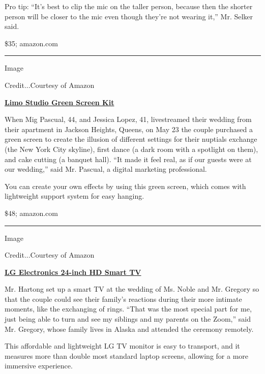 Pro tip: ``It's best to clip the mic on the taller person, because then
the shorter person will be closer to the mic even though they're not
wearing it,'' Mr. Selker said.

\$35; amazon.com

\begin{center}\rule{0.5\linewidth}{\linethickness}\end{center}

Image

Credit...Courtesy of Amazon

\textbf{\href{https://www.amazon.com/Photography-Backdrop-Support-Backdrops-AGG2983/dp/B08286P37D/ref=sr_1_6?dchild=1\&keywords=green+screen+kit\&qid=1593181526\&sr=8-6}{Limo
Studio Green Screen Kit}}

When Mig Pascual, 44, and Jessica Lopez, 41, livestreamed their wedding
from their apartment in Jackson Heights, Queens, on May 23 the couple
purchased a green screen to create the illusion of different settings
for their nuptials exchange (the New York City skyline), first dance (a
dark room with a spotlight on them), and cake cutting (a banquet hall).
``It made it feel real, as if our guests were at our wedding,'' said Mr.
Pascual, a digital marketing professional.

You can create your own effects by using this green screen, which comes
with lightweight support system for easy hanging.

\$48; amazon.com

\begin{center}\rule{0.5\linewidth}{\linethickness}\end{center}

Image

Credit...Courtesy of Amazon

\textbf{\href{https://www.amazon.com/LG-Electronics-24LM530S-PU-24-Inch-webOS/dp/B086XL48ZF/ref=sr_1_2?dchild=1\&keywords=24-inch+smart+tv\&qid=1593109780\&s=tv\&sr=1-2}{LG
Electronics 24-inch HD Smart TV}}

Mr. Hartong set up a smart TV at the wedding of Ms. Noble and Mr.
Gregory so that the couple could see their family's reactions during
their more intimate moments, like the exchanging of rings. ``That was
the most special part for me, just being able to turn and see my
siblings and my parents on the Zoom,'' said Mr. Gregory, whose family
lives in Alaska and attended the ceremony remotely.

This affordable and lightweight LG TV monitor is easy to transport, and
it measures more than double most standard laptop screens, allowing for
a more immersive experience.

